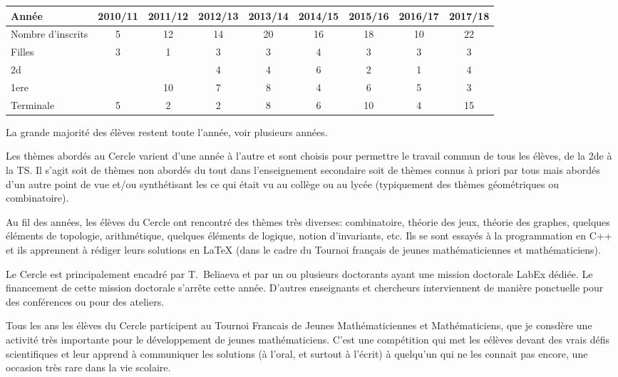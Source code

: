 \documentclass[11pt,notitlepage]{article}
\begin{document}
\medskip

\begin{tabular}{|l|c|c|c|c|c|c|c|c|}
	\hline
	Ann\'ee & 2010/11&2011/12&2012/13&2013/14&2014/15&2015/16& 2016/17&2017/18\\
	\hline
	Nombre d'inscrits&5 &12 &14 & 20&16 & 18&10 &22 \\
	\hline
	Filles& 3&1 &3 &3&4 &3 & 3&3 \\
	\hline
	2d& & &4 &4 &6 &2 &1 & 4\\
	\hline
	1ere& & 10&7 & 8&4 &6 &5 &3 \\
	\hline
	Terminale&5 &2 &2 &8 &6 &10 &4 &15 \\
	\hline
\end{tabular}

\medskip

La grande majorit\'e des \'el\`eves restent toute l'ann\'ee, voir plusieurs ann\'ees.

 Les th\`emes abord\'es au Cercle varient d'une ann\'ee \`a l'autre et
sont choisis pour permettre
le travail commun de tous les \'el\`eves, de la 2de \`a la TS. Il s'agit soit de th\`emes non abord\'es du tout dans l'enseignement secondaire soit de th\`emes connus \`a priori par tous mais abord\'es d'un autre point de vue et/ou synth\'etisant les ce qui \'etait vu au coll\`ege ou au lyc\'ee (typiquement des th\`emes g\'eom\'etriques ou combinatoire).

Au fil des ann\'ees, les \'el\`eves du Cercle ont rencontr\'e  des th\`emes tr\`es diverses: combinatoire, th\'eorie des jeux, th\'eorie des graphes, quelques \'el\'ements de topologie, arithm\'etique, quelques \'el\'ements de logique, notion d'invariants, etc. Ils se sont essay\'es \`a la programmation en C++ et ils apprennent \`a r\'ediger  leurs solutions en LaTeX (dans le cadre du Tournoi fran\c cais de jeunes math\'ematiciennes et math\'ematiciens).

Le Cercle est principalement encadr\'e par T.~Beliaeva et par un ou plusieurs doctorants ayant une mission doctorale LabEx d\'edi\'ee. Le financement de cette mission doctorale s'arr\^ete cette ann\'ee. D'autres enseignants et chercheurs interviennent de mani\`ere ponctuelle pour des conf\'erences ou pour des ateliers.

Tous les ans les \'el\`eves du Cercle  participent au Tournoi Francais de Jeunes Math\'ematiciennes et Math\'ematiciens, que je consd\`ere une activit\'e tr\`es importante pour le d\'eveloppement de jeunes math\'ematiciens. C'est une comp\'etition qui met les e\'el\`eves devant des vrais d\'efis scientifiques et leur  apprend \`a communiquer les solutions (\`a l'oral, et surtout \`a l'\'ecrit) \`a quelqu'un qui ne les connait pas encore, une occasion tr\`es rare dans la vie scolaire.
\end{document}
